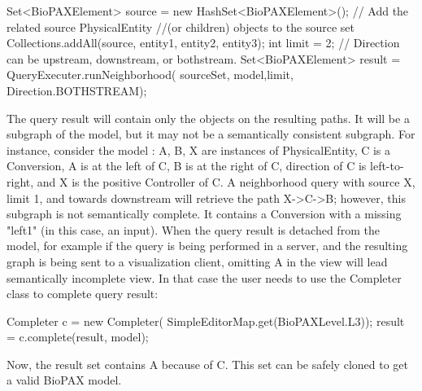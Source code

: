 \documentclass{tufte-book}
\begin{document}
\begin{javacode}
  Set<BioPAXElement> source = new HashSet<BioPAXElement>();
  // Add the related source PhysicalEntity 
  //(or children) objects to the  source set
  Collections.addAll(source, entity1, entity2, entity3);
  int limit = 2;
  // Direction can be upstream, downstream, or bothstream.
  Set<BioPAXElement> result = QueryExecuter.runNeighborhood(
   sourceSet, model,limit, Direction.BOTHSTREAM);
\end{javacode}

The query result will contain only the objects on the resulting paths. It will be a subgraph of the model, but it may not be a semantically consistent subgraph. For instance, consider the model : A, B, X are instances of PhysicalEntity, C is a Conversion, A is at the left of C, B is at the right of C, direction of C is left-to-right, and X is the positive Controller of C.
A neighborhood query with source X, limit 1, and towards downstream will retrieve the path X->C->B; however, this subgraph is not semantically complete. It contains a Conversion with a missing "left1" (in this case, an input). When the query result is detached from the model, for example if the query is being performed in a server, and the resulting graph is being sent to a visualization client, omitting A in the view will lead semantically incomplete view. In that case the user needs to use the Completer class to complete query result:

\begin{javacode}
Completer c = new Completer(
 SimpleEditorMap.get(BioPAXLevel.L3));
result = c.complete(result, model);
\end{javacode}

Now, the result set contains A because of C. This set can be safely cloned to get a valid BioPAX model.
\end{document}
